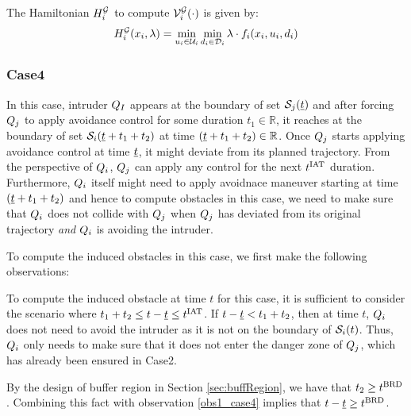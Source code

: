 The Hamiltonian $H^{\mathcal{G}}_{i}$ to compute $\mathcal{V}^{\mathcal{G}}_{i}(\cdot)$ is given by:
\begin{equation} \label{eqn:BRS_obsham}
\ham^{\mathcal{G}}_{i}(\state_i, \costate) = \min_{\ctrl_i \in \cset_i} \min_{\dstb_i \in \dset_i} \costate \cdot f_i (\state_i, \ctrl_i, \dstb_i)
\end{equation}


\subsubsection{Case4} \label{sec:intruderObs_case4}
In this case, intruder $Q_{I}$ appears at the boundary of set $\mathcal{S}_j(\underline{t})$ and after forcing $Q_j$ to apply avoidance control for some duration $t_1 \in \mathbb{R}$, it reaches at the boundary of set $\mathcal{S}_i(\underline{t} + t_1 + t_2)$ at time $(\underline{t} + t_1 + t_2) \in \mathbb{R}$. Once $Q_j$ starts applying avoidance control at time $\underline{t}$, it might deviate from its planned trajectory. From the perspective of $Q_i$, $Q_j$ can apply any control for the next $t^\text{IAT}$ duration. Furthermore, $Q_i$ itself might need to apply avoidnace maneuver starting at time $(\underline{t} + t_1 + t_2)$ and hence to compute obstacles in this case, we need to make sure that $Q_i$ does not collide with $Q_j$ when $Q_j$ has deviated from its original trajectory \textit{and} $Q_i$ is avoiding the intruder.   

To compute the induced obstacles in this case, we first make the following observations:
\begin{observation} \label{obs1_case4}
To compute the induced obstacle at time $t$ for this case, it is sufficient to consider the scenario where $t_1 + t_2 \leq t - \underline{t} \leq t^\text{IAT}$. If $t - \underline{t} < t_1 + t_2$, then at time $t$, $Q_i$ does not need to avoid the intruder as it is not on the boundary of $\mathcal{S}_i(t)$. Thus, $Q_i$ only needs to make sure that it does not enter the danger zone of $Q_j$, which has already been ensured in Case2. 
\end{observation}
\begin{observation} \label{obs2_case4}
By the design of buffer region in Section \ref{sec:buffRegion}, we have that $t_2 \geq t^\text{BRD}$. Combining this fact with observation \ref{obs1_case4} implies that $t- \underline{t} \geq t^\text{BRD}$.
\end{observation}

